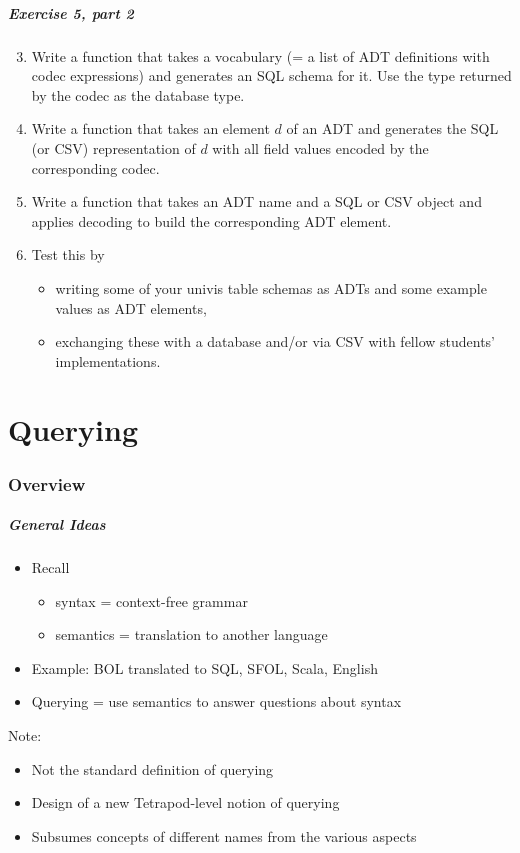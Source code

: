 \documentclass{beamer}
\begin{document}
\begin{frame}\frametitle{Exercise 5, part 2}

\begin{enumerate}
\setcounter{enumi}{2}
 \item Write a function that takes a vocabulary (= a list of ADT definitions with codec expressions) and generates an SQL schema for it.
 Use the type returned by the codec as the database type.
 \item Write a function that takes an element $d$ of an ADT and generates the SQL (or CSV) representation of $d$ with all field values encoded by the corresponding codec.
 \item Write a function that takes an ADT name and a SQL or CSV object and applies decoding to build the corresponding ADT element.
 \item Test this by
 \begin{itemize}
 \item writing some of your univis table schemas as ADTs and some example values as ADT elements,
 \item exchanging these with a database and/or via CSV with fellow students' implementations.
 \end{itemize}
\end{enumerate}
\end{frame}

\part{Querying}

\section{Overview}

\begin{frame}\frametitle{General Ideas}
\begin{itemize}
\item Recall
 \begin{itemize}
 \item syntax = context-free grammar
 \item semantics = translation to another language
 \end{itemize}
\item Example: BOL translated to SQL, SFOL, Scala, English
\item Querying = use semantics to answer questions about syntax
\end{itemize}
\medskip

Note:
\begin{itemize}
\item Not the standard definition of querying
\item Design of a new Tetrapod-level notion of querying
\item Subsumes concepts of different names from the various aspects
\end{itemize}
\end{frame}
\end{document}
